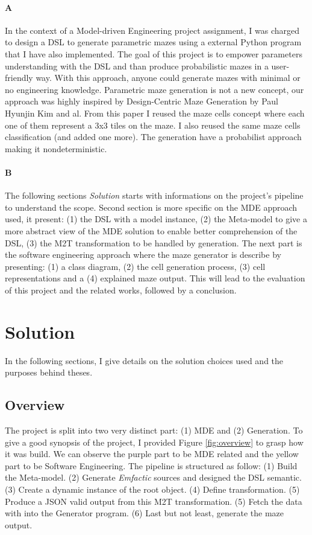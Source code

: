 \documentclass[review]{elsarticle}
\begin{document}
\paragraph{A}
In the context of a Model-driven Engineering project assignment, I was charged to design a DSL to generate parametric mazes using a external Python program that I have also implemented. The goal of this project is to empower parameters understanding with the DSL and than produce probabilistic mazes in a user-friendly way. With this approach, anyone could generate mazes with minimal or no engineering knowledge. Parametric maze generation is not a new concept, our approach was highly inspired by Design-Centric Maze Generation by Paul Hyunjin Kim and al\cite{kim_design-centric_2019}. From this paper I reused the maze cells concept where each one of them represent a 3x3 tiles on the maze. I also reused the same maze cells classification (and added one more). The generation have a probabilist approach making it nondeterministic.

\paragraph{B}
The following sections \textit{Solution} starts with informations on the project's pipeline to understand the scope. Second section is more specific on the MDE approach used, it present: (1) the DSL with a model instance, (2) the Meta-model to give a more abstract view of the MDE solution to enable better comprehension of the DSL, (3) the M2T transformation to be handled by generation. The next part is the software engineering approach where the maze generator is describe by presenting: (1) a class diagram, (2) the cell generation process, (3) cell representations and a (4) explained maze output. This will lead to the evaluation of this project and the related works, followed by a conclusion.

\section{Solution}
In the following sections, I give details on the solution choices used and the purposes behind theses.

\subsection{Overview}
The project is split into two very distinct part: (1) MDE and (2) Generation. To give a good synopsis of the project, I provided Figure \ref{fig:overview} to grasp how it was build. We can observe the purple part to be MDE related and the yellow part to be Software Engineering. The pipeline is structured as follow: (1) Build the Meta-model. (2) Generate \textit{Emfactic} sources and designed the DSL semantic. (3) Create a dynamic instance of the root object. (4) Define transformation. (5) Produce a JSON valid output from this M2T transformation. (5) Fetch the data with into the Generator program. (6) Last but not least, generate the maze output.
\end{document}
